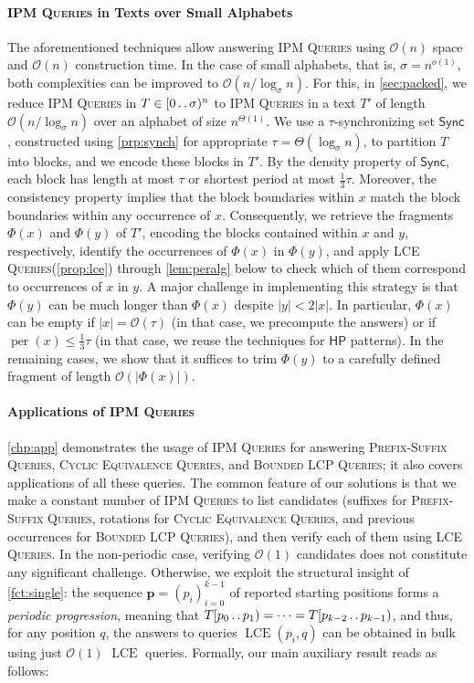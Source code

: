 \documentclass[a4paper]{article}
\theoremstyle{definition}
\theoremstyle{remark}
\newcommand{\IPM}{\textsc{IPM Queries}\xspace}
\newcommand{\BQ}{\textsc{Prefix-Suffix Queries}\xspace}
\newcommand{\FC}{\textsc{Cyclic Equivalence Queries}\xspace}
\newcommand{\BLCP}{\textsc{Bounded LCP Queries}\xspace}
\newcommand{\LCEQ}{\textsc{LCE Queries}\xspace}
\newcommand{\LCE}{\operatorname{LCE}\xspace}
\newcommand{\HP}{\mathsf{HP}}
\newcommand{\dd}{\mathinner{\ldotp\ldotp}}
\DeclareMathOperator{\per}{per}
\newcommand{\Oh}{\mathcal{O}}
\renewcommand{\S}{\mathsf{Sync}}
\renewcommand{\S}{\mathsf{Sync}}
\begin{document}
\paragraph{\IPM in Texts over Small Alphabets}
The aforementioned techniques allow answering \IPM using $\Oh(n)$ space and $\Oh(n)$ construction time.
In the case of small alphabets, that is, $\sigma = n^{o(1)}$, both complexities can be improved to $\Oh(n/\log_\sigma n)$.
For this, in \cref{sec:packed}, we reduce \IPM in $T\in [0\dd \sigma)^n$ to \IPM in a text $T'$ of length $\Oh(n/\log_\sigma n)$
over an alphabet of size $n^{\Theta(1)}$. 
We use a $\tau$-synchronizing set $\S$, constructed using \cref{prp:synch} for appropriate $\tau=\Theta(\log_\sigma n)$,
to partition $T$ into blocks, and we encode these blocks in $T'$.
By the density property of $\S$, each block has length at most $\tau$ or shortest period at most $\frac13\tau$.
Moreover, the consistency property implies that the block boundaries within $x$ match the block boundaries within any occurrence of $x$.
Consequently, we retrieve the fragments $\Phi(x)$ and $\Phi(y)$ of $T'$, encoding the blocks contained within $x$ and $y$, respectively,
identify the occurrences of $\Phi(x)$ in $\Phi(y)$, and apply \LCEQ (\cref{prop:lce}) through \cref{lem:peralg} below to check which of them correspond to occurrences of $x$ in $y$.
A major challenge in implementing this strategy is that $\Phi(y)$ can be much longer than $\Phi(x)$ despite $|y|<2|x|$.
In particular, $\Phi(x)$ can be empty if $|x|=\Oh(\tau)$ (in that case, we precompute the answers) or if $\per(x)\le \frac13\tau$ (in that case, we reuse the techniques for $\HP$ patterns). In the remaining cases, we show that it suffices to trim $\Phi(y)$ to a carefully defined fragment of length $\Oh(|\Phi(x)|)$.

\paragraph{Applications of \IPM}
\cref{chp:app} demonstrates the usage of \IPM for answering \BQ, \FC, and \BLCP; it also covers applications of all these queries.
The common feature of our solutions is that we make a constant number of \IPM to list candidates (suffixes for \BQ, rotations for \FC, and previous occurrences for \BLCP), and then verify each of them using \LCEQ.
In the non-periodic case, verifying $\Oh(1)$ candidates does not constitute any significant challenge. 
Otherwise, we exploit the structural insight of \cref{fct:single}: the sequence $\mathbf{p}=(p_i)_{i=0}^{k-1}$
of reported starting positions forms a \emph{periodic progression}, meaning that $T[p_0\dd p_1)=\cdots = T[p_{k-2}\dd p_{k-1})$,
and thus, for any position $q$, the answers to queries $\LCE(p_i,q)$ can be obtained in bulk using just $\Oh(1)$ $\LCE$ queries. 
Formally, our main auxiliary result reads as follows:
\end{document}
